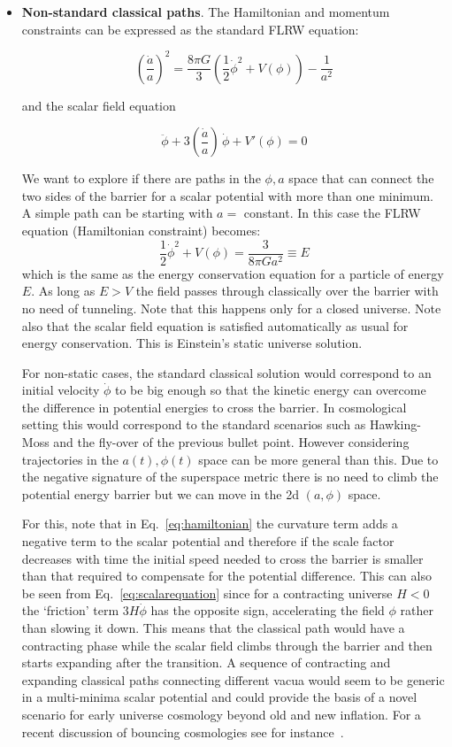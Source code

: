 \documentclass[a4paper,11pt]{article}
\numberwithin{equation}{section}
\newcommand{\be}{\begin{equation}}
\newcommand{\ee}{\end{equation}}
\begin{document}
\begin{itemize}
\item{\bf Non-standard classical paths}. 
The Hamiltonian and momentum constraints can be expressed as the standard FLRW equation:

\be
\left(\frac{\dot a}{a}\right)^2=\frac{8\pi G}{3}\left(\frac{1}{2}\dot\phi^2+V(\phi)\right)-\frac{1}{a^2}\label{eq:hamiltonian}
\ee

and the scalar field equation

\be
\ddot\phi+3\left(\frac{\dot a}{a}\right)\, \dot\phi + V'(\phi)=0\label{eq:scalarequation} 
\ee

We want to explore if there are paths in the $\phi,a$ space that can connect the two sides of the barrier for a scalar potential with more than one minimum. A simple path can be starting with $a=$ constant. In this case the FLRW equation (Hamiltonian constraint) becomes:
\be
\frac{1}{2}\dot\phi^2+V(\phi)=\frac{3}{8\pi Ga^2}\equiv E
\ee
which is the same as the  energy conservation equation for a particle of energy $E$. As long as $E>V$ the field passes through classically over the barrier with no need of tunneling. Note that this happens only for a closed universe. Note also that the scalar field equation is satisfied automatically as usual for energy conservation. This is Einstein's static universe solution. 

For non-static cases, the standard classical solution would correspond to an initial velocity $\dot\phi$ to be big enough so that the kinetic energy can overcome the difference in potential energies to cross the barrier.  In cosmological setting this would correspond to the standard scenarios such as Hawking-Moss and the fly-over of the previous bullet point. However considering trajectories in the  $a(t), \phi(t)$ space can be more general than this. Due to the negative signature of the superspace metric there is no need to climb the potential energy barrier but we can move in the 2d $(a, \phi)$ space. 

For this, note that in Eq.~\eqref{eq:hamiltonian} the curvature term adds a negative term to the scalar potential and therefore if the scale factor decreases with time the initial speed needed to cross the barrier is smaller than that required to compensate for the potential difference. This can also be seen from Eq.~\eqref{eq:scalarequation} since for a contracting universe $H<0$  the ‘friction’  term $3H\dot\phi$ has the opposite sign, accelerating the field $\phi$ rather than slowing it down. This means that the classical path would have a contracting phase while the scalar field climbs through the barrier and then starts expanding after the transition. A sequence of contracting and expanding classical paths connecting different vacua would seem to be generic in a multi-minima scalar potential and could provide the basis of a novel scenario for early universe cosmology beyond old and new inflation. For a recent discussion of bouncing cosmologies see for instance~\cite{Gungor:2020fce}.




\end{itemize}
\end{document}
